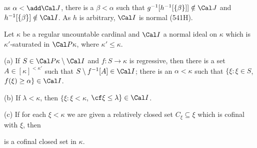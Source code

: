 {

\noindent as $\alpha<\add\Cal J$, there is a $\beta<\alpha$ such that
$g^{-1}[h^{-1}[\{\beta\}]]\notin\Cal J$ and
$h^{-1}[\{\beta\}]\notin\Cal I$.   As $h$ is arbitrary, $\Cal I$ is
normal (541H).\ \Qed
}%

Let $\kappa$ be a regular uncountable cardinal and $\Cal I$ a
normal ideal on $\kappa$ which is $\kappa'$-saturated in $\Cal P\kappa$,
where $\kappa'\le\kappa$.

(a) If $S\in\Cal P\kappa\setminus\Cal I$ and $f:S\to\kappa$ is
regressive, then there is a set $A\in[\kappa]^{<\kappa'}$ such that
$S\setminus f^{-1}[A]\in\Cal I$;   there is an
$\alpha<\kappa$ such that
$\{\xi:\xi\in S$, $f(\xi)\ge\alpha\}\in\Cal I$.

(b) If $\lambda<\kappa$, then
$\{\xi:\xi<\kappa$, $\cf\xi\le\lambda\}\in\Cal I$.

(c) If for each $\xi<\kappa$ we are given a relatively closed set
$C_{\xi}\subseteq\xi$ which is cofinal with $\xi$, then


\noindent is a cofinal closed set in $\kappa$.

